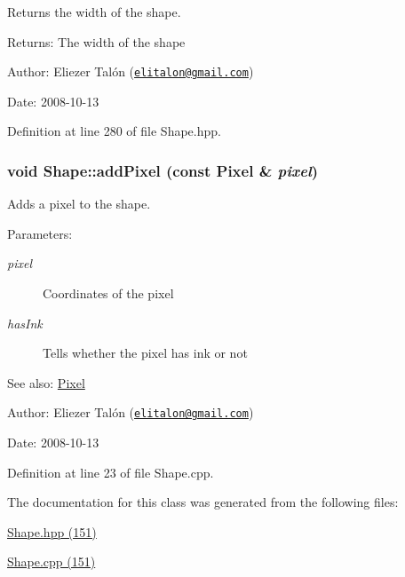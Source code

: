 Returns the width of the shape. 

\begin{Desc}
\item[Returns:]The width of the shape\end{Desc}
\begin{Desc}
\item[Author:]Eliezer Talón (\href{mailto:elitalon@gmail.com}{\tt elitalon@gmail.com}) \end{Desc}
\begin{Desc}
\item[Date:]2008-10-13 \end{Desc}


Definition at line 280 of file Shape.hpp.\hypertarget{class_shape_f6114234203d9473f1fef9e6391f9243}{
\subsubsection[addPixel]{\setlength{\rightskip}{0pt plus 5cm}void Shape::addPixel (const {\bf Pixel} \& {\em pixel})}}
\label{class_shape_f6114234203d9473f1fef9e6391f9243}


Adds a pixel to the shape. 

\begin{Desc}
\item[Parameters:]
\begin{description}
\item[{\em pixel}]Coordinates of the pixel \item[{\em hasInk}]Tells whether the pixel has ink or not\end{description}
\end{Desc}
\begin{Desc}
\item[See also:]\hyperlink{_pixel_8hpp_535e59456e3e633842529cfa8ea103c4}{Pixel}\end{Desc}
\begin{Desc}
\item[Author:]Eliezer Talón (\href{mailto:elitalon@gmail.com}{\tt elitalon@gmail.com}) \end{Desc}
\begin{Desc}
\item[Date:]2008-10-13 \end{Desc}


Definition at line 23 of file Shape.cpp.

The documentation for this class was generated from the following files:\begin{CompactItemize}
\item 
\hyperlink{_shape_8hpp}{Shape.hpp (151)}\item 
\hyperlink{_shape_8cpp}{Shape.cpp (151)}\end{CompactItemize}
